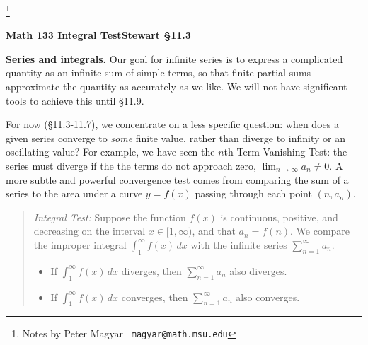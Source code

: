 \documentclass[11pt]{article}
\begin{document}
\footnote[0]{Notes by Peter Magyar \ {\tt magyar@math.msu.edu}}
\vspace{-1em}

\centerline{\bf Math 133\hspace{1.5em} \hfill{\Large\bf
Integral Test}\hfill Stewart \S11.3}
\vspace{1em}

\noindent 
{\bf Series and integrals.} 
Our goal for infinite series is to express a complicated quantity
as an infinite sum of simple terms, so that finite partial sums 
approximate the quantity as accurately as we like.
We will not have significant tools to achieve this until \S11.9.

For now (\S11.3-11.7), we concentrate on a less specific question: 
when does a given series converge to {\it some} finite value, 
rather than diverge to infinity or an oscillating value?
For example, we have seen the $n$th Term Vanishing Test: 
the series must diverge if the the terms do not approach zero, $\lim_{n\to\infty}a_n\neq 0$.
A more subtle and powerful convergence test comes
from comparing the sum of a series to the area under a curve
$y=f(x)$ passing through each point $(n,a_n)$.

\begin{quote}
{\it Integral Test:} Suppose the function $f(x)$ is continuous,
positive, and decreasing on the interval $x\in[1,\infty)$,
and that $a_n=f(n)$. We compare the improper integral  $\int_1^\infty f(x)\,dx$
with the infinite series $\sum_{n=1}^\infty a_n$.

\begin{itemize}
\item If $\int_1^\infty f(x)\,dx$ diverges, 
then $\sum_{n=1}^\infty a_n$ also diverges.
\item If $\int_1^\infty f(x)\,dx$ converges, 
then $\sum_{n=1}^\infty a_n$ also converges.
\end{itemize}
\end{quote}
\medskip
\end{document}
